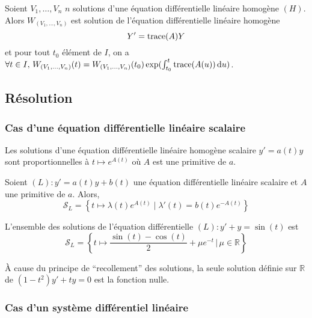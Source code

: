 
  \begin{proposition}
    Soient $V_1, \dots, V_n$ $n$ solutions d'une équation différentielle linéaire homogène $(H)$. Alors $W_{(V_1, \dots, V_n)}$ est solution de l'équation différentielle linéaire homogène
    \[ Y' = \operatorname{trace}(A) Y \]
    et pour tout $t_0$ élément de $I$, on a $\forall t \in I, \, W_{(V_1, \dots, V_n)}(t) = W_{(V_1, \dots, V_n)}(t_0) \exp(\int_{t_0}^t \operatorname{trace}(A(u)) \, \mathrm{d}u)$.
  \end{proposition}

  \subsection{Résolution}

  \subsubsection{Cas d'une équation différentielle linéaire scalaire}


  \begin{proposition}
    Les solutions d'une équation différentielle linéaire homogène scalaire $y' = a(t) y$ sont proportionnelles à $t \mapsto e^{A(t)}$ où $A$ est une primitive de $a$.
  \end{proposition}

  \begin{corollary}
    Soient $(L) : y' = a(t) y + b(t)$ une équation différentielle linéaire scalaire et $A$ une primitive de $a$. Alors,
    \[ \mathcal{S}_L = \left\{t \mapsto \lambda(t) e^{A(t)} \mid \lambda'(t) = b(t)e^{-A(t)}\right\} \]
  \end{corollary}

  \begin{example}
    L'ensemble des solutions de l'équation différentielle $(L) : y' + y = \sin(t)$ est
    \[ \mathcal{S}_L = \left \{ t \mapsto \frac{\sin(t) - \cos(t)}{2} + \mu e^{-t} \, \big\lvert \, \mu \in \mathbb{R} \right \} \]
  \end{example}

  \begin{example}
    À cause du principe de ``recollement'' des solutions, la seule solution définie sur $\mathbb{R}$ de $(1-t^2)y' + ty = 0$ est la fonction nulle.
  \end{example}

  \subsubsection{Cas d'un système différentiel linéaire}

